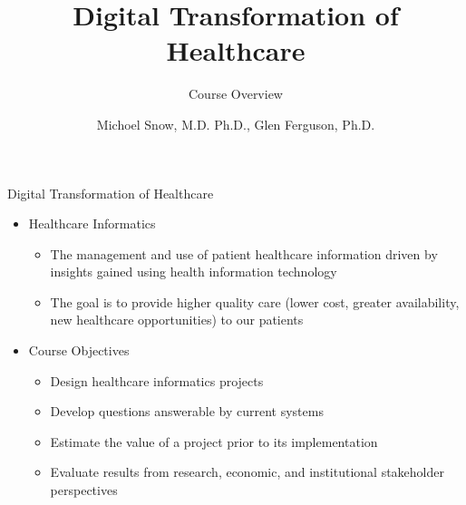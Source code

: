\documentclass[10pt]{beamer}
\title{Digital Transformation of Healthcare}
\subtitle{Course Overview}
\date{}
\author{Michoel Snow, M.D. Ph.D., Glen Ferguson, Ph.D.}
\institute{Center for Health Data Innovations}
\begin{document}
\maketitle


\begin{frame}{Digital Transformation of Healthcare}
	\begin{itemize}
		\item Healthcare Informatics
		\begin{itemize}
			\item The management and use of patient healthcare information driven by insights gained using health information technology
			\item The goal is to provide higher quality care (lower cost, greater availability, new healthcare opportunities) to our patients
		\end{itemize}
		\item Course Objectives
		\begin{itemize}
			\item Design healthcare informatics projects
			\item Develop questions answerable by current systems
			\item Estimate the value of a project prior to its implementation
			\item Evaluate results from research, economic, and institutional stakeholder  perspectives
		\end{itemize}
	\end{itemize}
\end{frame}
\end{document}
